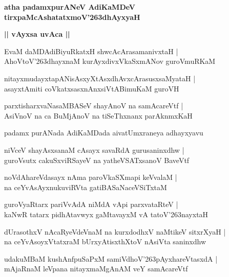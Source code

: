 \documentclass[twoside,12pt,openright]{book}
\def\S{\char'263}
\newcounter{shloka}[chapter]
\def\uvaca#1{\centerline{{\large\textbf{#1}}}}
\begin{document}
\begin{center}
{\LARGE\bfseries atha padamxpurANeV AdiKaMDeV tirxpaMcAshatatxmoV\S dhAyxyaH}
\end{center}

\uvaca{|| vAyxsa uvAca ||}

\begin{shloka}
EvaM daMDAdiBiyuRkatxH shwcAcArasamanivxtaH |\\
AhoVtoV\S dhayxnaM kurAyxdivxVkaSxmANov guroVmuRKaM 
\end{shloka}

\begin{shloka}
nitayxmudayxtapANisAsxyXtAsxdhAvxcArasusxsaMyataH |\\
asayxtAmiti coVkatxsasxnAnxsiVtABimuKaM guroVH 
\end{shloka}

\begin{shloka}
parxtisharxvaNasaMBASeV shayAnoV na samAcareVtf |\\
AsiVnoV na ca BuMjAnoV na tiSeThxnanx parAknmxKaH 
\end{shloka}

\begin{center}
padamx purANada AdiKaMDada aivatUmxraneya adhayxyavu
\end{center}

\begin{shloka}
niVceV shayAsxsanaM cAsayx savaRdA gurusaninxdhw |\\
guroVsutx cakuSxviRSayeV na yatheVSATxsanoV BaveVtf 
\end{shloka}

\begin{shloka}
noVdAhareVdasayx nAma paroVkaSXmapi keVvalaM |\\
na ceYvAsAyxnukuviRVta gatiBASaNaceVSiTxtaM 
\end{shloka}

\begin{shloka}
guroVyaRtarx pariVvAdA niMdA vApi parxvataRteV |\\
kaNwR tatarx pidhAtavwyx gaMtavayxM vA tatoV\S nayxtaH 
\end{shloka}

\begin{shloka}
dUrasothxV nAcaRyeVdeVnaM na kurxdodhxV naMtikeV sitxrXyaH |\\
na ceYvAsoyxVtatxraM bUrxyAtisxthXtoV nAsiVta saninxdhw 
\end{shloka}

\begin{shloka}
udakuMBaM kushAnfpuSaPxM samiVdhoV\S pAyxhareVtasxdA |\\
mAjaRnaM leVpana  nitayxmaMgAnAM veY samAcareVtf
\end{shloka}
\end{document}
